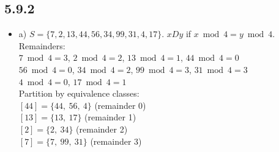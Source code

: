 \documentclass{article}
\begin{document}
\subsection*{5.9.2}
\begin{itemize}
    \item a) $S = \{7,2,13,44,56,34,99,31,4,17\}$. $xDy$ if $x \bmod 4 = y \bmod 4$.\\[4pt]
    Remainders:\\
    $7 \bmod 4 = 3$, \quad $2 \bmod 4 = 2$, \quad $13 \bmod 4 = 1$, \quad $44 \bmod 4 = 0$\\
    $56 \bmod 4 = 0$, \quad $34 \bmod 4 = 2$, \quad $99 \bmod 4 = 3$, \quad $31 \bmod 4 = 3$\\
    $4 \bmod 4 = 0$, \quad $17 \bmod 4 = 1$\\[4pt]
    Partition by equivalence classes:\\
    $[44] = \{44,\ 56,\ 4\}$ \quad (remainder 0)\\
    $[13] = \{13,\ 17\}$ \quad (remainder 1)\\
    $[2] = \{2,\ 34\}$ \quad (remainder 2)\\
    $[7] = \{7,\ 99,\ 31\}$ \quad (remainder 3)
\end{itemize}
\end{document}

